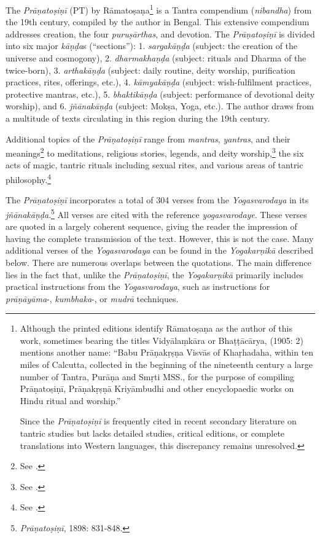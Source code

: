 The \textit{Prāṇatoṣiṇī} (PT) by Rāmatoṣaṇa\footnote{Although the printed editions identify Rāmatoṣaṇa as the author of this work, sometimes bearing the titles Vidyālaṃkāra or Bhaṭṭācārya, \citeauthor{shastri1905} (1905: 2) mentions another name: ``Babu Prāṇakṛṣṇa Visvās of Khaṛhadaha, within ten miles of Calcutta, collected in the beginning of the nineteenth century a large number of Tantra, Purāṇa and Smṛti MSS., for the purpose of compiling Prāṇatoṣiṇī, Prāṇakṛṣṇā Kriyāmbudhi and other encyclopaedic works on Hindu ritual and worship.''

Since the \textit{Prāṇatoṣiṇī} is frequently cited in recent secondary literature on tantric studies but lacks detailed studies, critical editions, or complete translations into Western languages, this discrepancy remains unresolved.} is a Tantra compendium (\textit{nibandha}) from the 19th century, compiled by the author in Bengal. This extensive compendium addresses creation, the four \textit{puruṣārthas}, and devotion. The \textit{Prāṇatoṣiṇī} is divided into six major \textit{kāṇḍa}s (``sections''): 1. \textit{sargakāṇḍa} (subject: the creation of the universe and cosmogony), 2. \textit{dharmakhaṇḍa} (subject: rituals and Dharma of the twice-born), 3. \textit{arthakāṇḍa} (subject: daily routine, deity worship, purification practices, rites, offerings, etc.), 4. \textit{kāmyakāṇḍa} (subject: wish-fulfilment practices, protective mantras, etc.), 5. \textit{bhaktikāṇḍa} (subject: performance of devotional deity worship), and 6. \textit{jñānakāṇḍa} (subject: Mokṣa, Yoga, etc.). The author draws from a multitude of texts circulating in this region during the 19th century.

Additional topics of the \textit{Prāṇatoṣiṇī} range from \textit{mantras}, \textit{yantras}, and their meanings\footnote{See \citeauthor[2010: 69-70]{slouber2010}.} to meditations, religious stories, legends, and deity worship,\footnote{See \citeauthor[1997: 149-150]{kinsley1997}.} the six acts of magic, tantric rituals including sexual rites, and various areas of tantric philosophy.\footnote{See \citeauthor[2010: 100]{urban2010}.}

The \textit{Prāṇatoṣiṇī} incorporates a total of 304 verses from the \textit{Yogasvarodaya} in its \textit{jñānakāṇḍa}.\footnote{\emph{Prāṇatoṣiṇī}, 1898: 831-848.} All verses are cited with the reference \textit{yogasvarodaye}. These verses are quoted in a largely coherent sequence, giving the reader the impression of having the complete transmission of the text. However, this is not the case. Many additional verses of the \emph{Yogasvarodaya} can be found in the \emph{Yogakarṇikā} described below. There are numerous overlaps between the quotations. The main difference lies in the fact that, unlike the \textit{Prāṇatoṣiṇī}, the \emph{Yogakarṇikā} primarily includes practical instructions from the \textit{Yogasvarodaya}, such as instructions for \textit{prāṇāyāma}-, \textit{kumbhaka}-, or \textit{mudrā} techniques.


